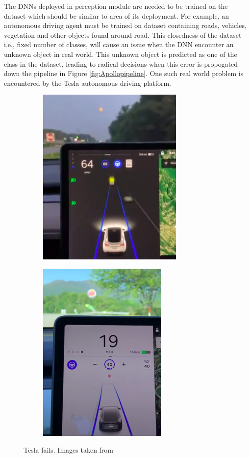 The DNNs deployed in perception module are needed to be trained on the dataset which should be similar to area of its deployment.
For example, an autonomous driving agent must be trained on dataset containing roads, vehicles, vegetation and other objects found around road.
This closedness of the dataset i.e., fixed number of classes, will cause an issue when the DNN encounter an unknown object in real world.
This unknown object is predicted as one of the class in the dataset, leading to radical decisions when this error is propogated down the pipeline in Figure \ref{fig:Apollopipeline}.
One such real world problem is encountered by the Tesla autonomous driving platform.
\begin{figure}[h!]
    \begin{subfigure}{0.48\textwidth}
        \centering
        \includegraphics[scale=0.5]{images/tesla_1.png}
        \caption{}
        \label{fig:teslafails_1}
    \end{subfigure}
    \begin{subfigure}{0.48\textwidth}
        \centering
        \includegraphics[scale=0.5]{images/tesla_2.png}
        \caption{}
        \label{fig:teslafails_2}
    \end{subfigure}
    \caption{Tesla fails. Images taken from \cite{tesla_fails}}
\end{figure}

